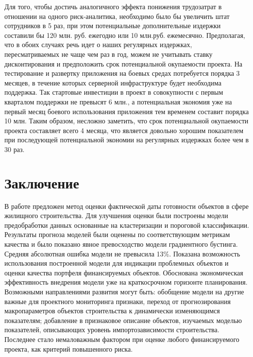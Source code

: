\documentclass[12pt,a4paper]{article} %
\begin{document}
Для того, чтобы достичь аналогичного эффекта понижения трудозатрат в отношении на одного риск-аналитика, необходимо было бы увеличить штат сотрудников в 5 раз, при этом потенциальные дополнительные издержки составили бы 120 млн. руб. ежегодно или 10 млн.руб. ежемесячно. Предполагая, что в обоих случаях речь идет о наших регулярных издержках, пересматриваемых не чаще чем раз в год, можем не учитывать ставку дисконтирования и предположить срок потенциальной окупаемости проекта. На тестирование и развертку приложения на боевых средах потребуется порядка 3 месяцев, в течение которых серверной инфраструктуре будет необходима поддержка. Так стартовые инвестиции в проект в совокупности с первым кварталом поддержки не превысят 6 млн., а потенциальная экономия уже на первый месяц боевого использования приложения тем временем составит порядка 10 млн. Таким образом, несложно заметить, что срок потенциальной окупаемости проекта составляет всего 4 месяца, что является довольно хорошим показателем при последующей потенциальной экономии на регулярных издержках более чем в 30 раз.




\newpage
\section{Заключение}

В работе предложен метод оценки фактической даты готовности объектов в сфере жилищного строительства. Для улучшения оценки были построены модели предобработки данных основанные на кластеризации и пороговой классификации. Результаты прогноза моделей были оценены по соответствующим метрикам качества и было показано явное превосходство модели градиентного бустинга. Средняя абсолютная ошибка модели не превысила 13\%. Показана возможность использования построенной модели для индикации проблемных объектов и оценки качества портфеля финансируемых объектов. Обоснована экономическая эффективность внедрения модели уже на краткосрочном горизонте планирования. Возможными направлениями развития могут быть: обобщение модели на другие важные для проектного мониторинга признаки, переход от прогнозирования макропараметров объектов строительства к динамически изменяющимся показателям; добавление в признаковое описание объектов, изучаемых моделью показателей, описывающих уровень импортозависимости строительства. Последнее стало немаловажным фактором при оценке любого финансируемого проекта, как критерий повышенного риска.



\newpage



\nocite{ Nikon, Antonov2014}
\nocite{JBarron, YNesterov, RobbinsMonro, Schmidt, Jaderberg, Mohri, Hastie, Friedman1, Friedman2, Karp, Chen, Chen2, Chusa, Asso, yus, liu, Minstr, domrf, erz, stroyStat}
\end{document}
